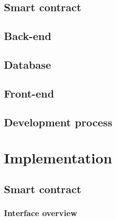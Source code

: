 \documentclass[12pt]{article}
\begin{document}
\subsection{Smart contract}

\subsection{Back-end}

\subsection{Database}

\subsection{Front-end}

\subsection{Development process}

\section{Implementation}

\subsection{Smart contract}

\subsubsection{Interface overview}
\end{document}
